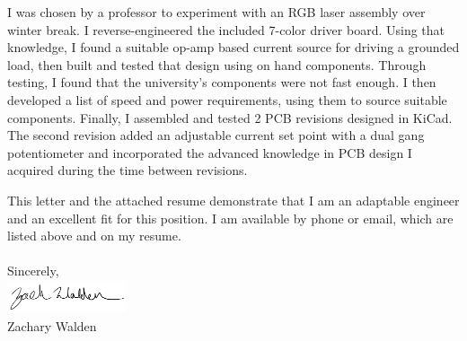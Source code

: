 \documentclass{article}
\begin{document}
\begin{adjustwidth}{70pt}{70pt}
\begin{spacing}{1.25}
I was chosen by a professor to experiment with an RGB laser assembly over winter break. I reverse-engineered the included 7-color driver board. Using that knowledge, I found a suitable op-amp based current source for driving a grounded load, then built and tested that design using on hand components. Through testing, I found that the university's components were not fast enough. I then developed a list of speed and power requirements, using them to source suitable components. Finally, I assembled and tested 2 PCB revisions designed in KiCad. The second revision added an adjustable current set point with a dual gang potentiometer and incorporated the advanced knowledge in PCB design I acquired during the time between revisions.

This letter and the attached resume demonstrate that I am an adaptable engineer and an excellent fit for this position.
I am available by phone or email, which are listed  above and on my resume.\\ \\
Sincerely,\\
	\includegraphics[width=3.5cm,height=1cm]{signature}
\\Zachary Walden

\vspace*{\fill}
\end{spacing}
\end{adjustwidth}

\newpage
\end{document}

